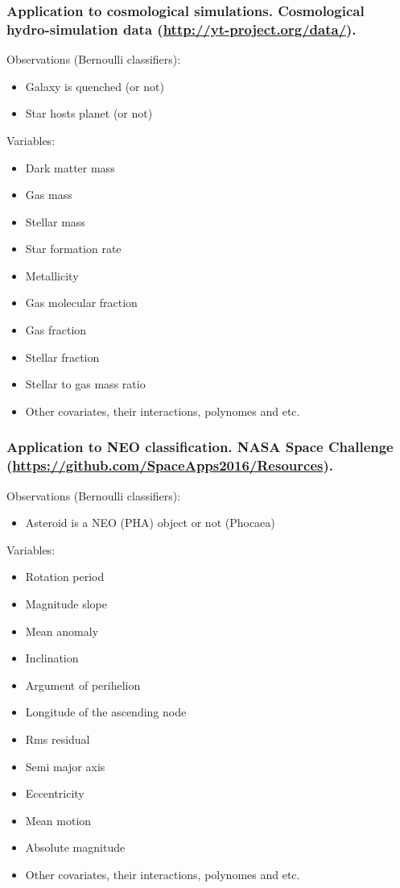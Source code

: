 \documentclass{beamer}
\begin{document}
\begin{frame}

\frametitle{Application to cosmological simulations. Cosmological hydro-simulation data (\url{http://yt-project.org/data/}).}
Observations (Bernoulli classifiers):
\begin{itemize}
\item Galaxy is quenched (or not)
\item Star hosts planet (or not)
\end{itemize}
Variables:
\begin{itemize}
\item Dark matter mass
\item Gas mass
\item Stellar mass
\item Star formation rate
\item Metallicity
\item Gas molecular fraction
\item Gas fraction
\item Stellar fraction
\item Stellar to gas mass ratio
\item Other covariates, their interactions, polynomes and etc.
\end{itemize}

\end{frame}

\begin{frame}

\frametitle{Application to NEO classification. NASA Space Challenge (\url{https://github.com/SpaceApps2016/Resources}).}
Observations (Bernoulli classifiers):
\begin{itemize}
\item Asteroid is a NEO (PHA) object or not (Phocaea)
\end{itemize}
Variables:
\begin{itemize}
\item Rotation period
\item Magnitude slope             
\item Mean anomaly
\item Inclination                    
\item Argument of perihelion          
\item Longitude of the ascending node
\item Rms residual
\item Semi major axis                
\item Eccentricity
\item Mean motion                    
\item Absolute magnitude
\item Other covariates, their interactions, polynomes and etc.
\end{itemize}

\end{frame}
\end{document}
